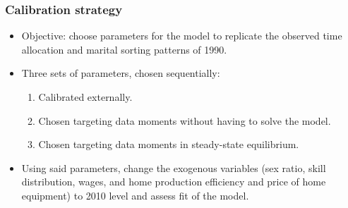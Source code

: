 \documentclass{beamer}
\begin{document}
\begin{frame}
	\frametitle{Calibration strategy}
	
	\begin{itemize}
		\item Objective: choose parameters for the model to replicate the observed time allocation and marital sorting patterns of 1990. 
		\item Three sets of parameters, chosen sequentially:
		\begin{enumerate}
			\item Calibrated externally.
			\item Chosen targeting data moments without having to solve the model.
			\item Chosen targeting data moments in steady-state equilibrium.
		\end{enumerate}
		\item Using said parameters, change the exogenous variables (sex ratio, skill distribution, wages, and home production efficiency and price of home equipment) to 2010 level and assess fit of the model.
	\end{itemize}
\end{frame}
\end{document}
